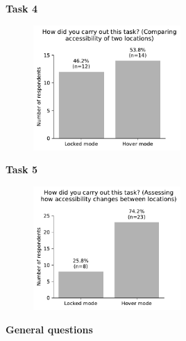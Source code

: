 \begin{appendices}
\begin{minipage}{\textwidth}
\textbf{Task 4}

\begin{figure}[H]
		\includegraphics[width=0.5\textwidth]{visual/figures/survey/5.pdf}
\end{figure}
\end{minipage}

\begin{minipage}{\textwidth}
\textbf{Task 5}

\begin{figure}[H]
		\includegraphics[width=0.5\textwidth]{visual/figures/survey/6.pdf}
\end{figure}
\end{minipage}

\begin{minipage}{\textwidth}
\textbf{General questions}


\end{minipage}
\end{appendices}
